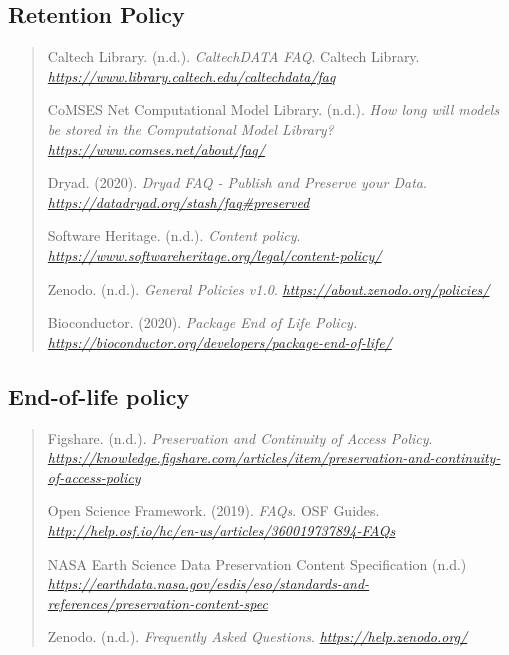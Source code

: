 \documentclass[]{article}
\begin{document}
\subsection{Retention Policy}\label{retention-policy}

\begin{quote}
Caltech Library. (n.d.). \emph{CaltechDATA FAQ}. Caltech Library.
\href{https://www.library.caltech.edu/caltechdata/faq}{\emph{https://www.library.caltech.edu/caltechdata/faq}}

CoMSES Net Computational Model Library. (n.d.). \emph{How long will
models be stored in the Computational Model Library?
\href{https://www.comses.net/about/faq/}{\emph{https://www.comses.net/about/faq/}}}

Dryad. (2020). \emph{Dryad FAQ - Publish and Preserve your Data}.
\href{https://datadryad.org/stash/faq\#preserved}{\emph{https://datadryad.org/stash/faq\#preserved}}

Software Heritage. (n.d.). \emph{Content policy}.
\href{https://www.softwareheritage.org/legal/content-policy/}{\emph{https://www.softwareheritage.org/legal/content-policy/}}

Zenodo. (n.d.). \emph{General Policies v1.0}.
\href{https://about.zenodo.org/policies/}{\emph{https://about.zenodo.org/policies/}}

Bioconductor. (2020). \emph{Package End of Life Policy.
\url{https://bioconductor.org/developers/package-end-of-life/} }
\end{quote}

\subsection{End-of-life policy}\label{end-of-life-policy}

\begin{quote}
Figshare. (n.d.). \emph{Preservation and Continuity of Access Policy}.
\href{https://knowledge.figshare.com/articles/item/preservation-and-continuity-of-access-policy}{\emph{https://knowledge.figshare.com/articles/item/preservation-and-continuity-of-access-policy}}

Open Science Framework. (2019). \emph{FAQs}. OSF Guides.
\href{http://help.osf.io/hc/en-us/articles/360019737894-FAQs}{\emph{http://help.osf.io/hc/en-us/articles/360019737894-FAQs}}

NASA Earth Science Data Preservation Content Specification (n.d.)
\emph{\url{https://earthdata.nasa.gov/esdis/eso/standards-and-references/preservation-content-spec}
}

Zenodo. (n.d.). \emph{Frequently Asked Questions}.
\href{https://help.zenodo.org/}{\emph{https://help.zenodo.org/}}
\end{quote}
\end{document}

